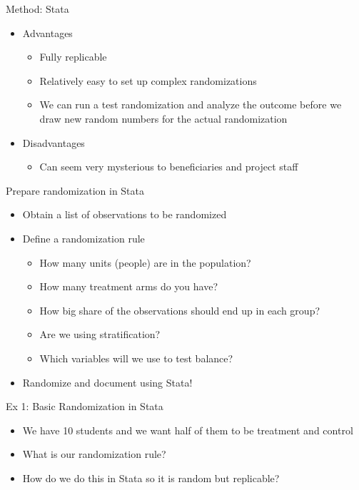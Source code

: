 \documentclass[aspectratio=169]{beamer}
\begin{document}
\begin{frame}{Method: Stata}
	\begin{itemize}
		\item Advantages
		\begin{itemize}
			\item Fully replicable
			\item Relatively easy to set up complex randomizations
			\item We can run a test randomization and analyze the outcome before we draw new random numbers for the actual randomization
		\end{itemize}
		\item Disadvantages
		\begin{itemize}
			\item Can seem very mysterious to beneficiaries and project staff
		\end{itemize}
	\end{itemize}
\end{frame}



\begin{frame}{Prepare randomization in Stata}
	\begin{itemize}
		\item Obtain a list of observations to be randomized
		\item Define a randomization rule
		\begin{itemize}
			\item How many units (people) are in the population?
			\item How many treatment arms do you have?
			\item How big share of the observations should end up in each group?
			\item Are we using stratification?
			\item Which variables will we use to test balance?
		\end{itemize}
		\item Randomize and document using Stata!
	\end{itemize}
\end{frame}



\begin{frame}{Ex 1: Basic Randomization in Stata}
	\begin{itemize}
		\item We have 10 students and we want half of them to be treatment and control
		\item What is our randomization rule?
		\item How do we do this in Stata so it is random but replicable?
	\end{itemize}
\end{frame}
\end{document}
